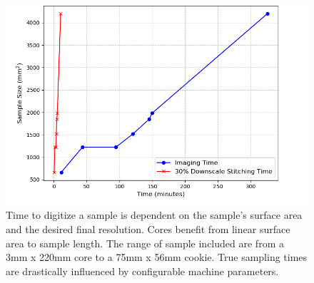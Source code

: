 \documentclass[a4paper,12pt]{article}
\begin{document}
\begin{figure}
    \centering
    \includegraphics[height=0.5\linewidth]{../../code/plots/time_and_area.png}
    \caption{Time to digitize a sample is dependent on the sample's surface area and the desired final resolution.
    Cores benefit from linear surface area to sample length. The range of sample included are from a 3mm x 220mm core to a 75mm x 56mm cookie. True sampling times are drastically influenced by configurable machine parameters.} 
    \label{fig:digitization_time}
\end{figure}
\end{document}
